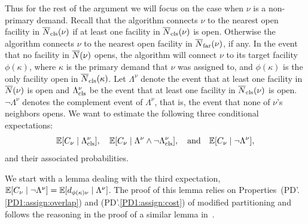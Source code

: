 \documentclass[oneside,final]{ucr}
\begin{document}
Thus for the rest of the argument we will focus on the case when $\nu$
is a non-primary demand.  Recall that the
algorithm connects $\nu$ to the nearest open facility in
${\overline{N}}_{{\mbox{\scriptsize\rm cls}}}(\nu)$ if at least one facility in ${\overline{N}}_{{\mbox{\scriptsize\rm cls}}}(\nu)$ is
open. Otherwise the algorithm connects $\nu$ to the nearest open
facility in ${\overline{N}}_{{\mbox{\scriptsize\rm far}}}(\nu)$, if any. In the event that no facility in
${\overline{N}}(\nu)$ opens, the algorithm will connect $\nu$ to its target
facility $\phi(\kappa)$, where $\kappa$ is the primary demand that
$\nu$ was assigned to, and $\phi(\kappa)$ is the only facility open in
${\overline{N}}_{{\mbox{\scriptsize\rm cls}}}(\kappa)$. Let $\Lambda^\nu$ denote the event that at least
one facility in ${\overline{N}}(\nu)$ is open and $\Lambda^\nu_{{\mbox{\scriptsize\rm cls}}}$ be the
event that at least one facility in ${\overline{N}}_{{\mbox{\scriptsize\rm cls}}}(\nu)$ is open.
$\neg \Lambda^\nu$ denotes the complement event of $\Lambda^\nu$, that is,
the event that none of $\nu$'s neighbors opens. 
We want to estimate the following three conditional expectations: 
%
\begin{equation*}
  \mathbb{E}[C_{\nu} \mid
  \Lambda^\nu_{{\mbox{\scriptsize\rm cls}}}],\quad \mathbb{E}[C_{\nu} \mid \Lambda^\nu \wedge \neg
  \Lambda^\nu_{{\mbox{\scriptsize\rm cls}}}], \quad\text{and}\quad \mathbb{E}[C_{\nu} \mid \neg \Lambda^\nu], 
\end{equation*}
%
and their associated probabilities.

We start with a lemma dealing with the third expectation,
$\mathbb{E}[C_\nu\mid\neg \Lambda^{\nu}] = \mathbb{E}[d_{\phi(\kappa)\nu} \mid
\Lambda^{\nu}]$. The proof of this lemma relies on
Properties~(PD'.\ref{PD1:assign:overlap}) and
(PD'.\ref{PD1:assign:cost}) of modified partitioning and follows the
reasoning in the proof of a similar lemma
in~\cite{ByrkaGS10,ByrkaA10}.

\end{document}
